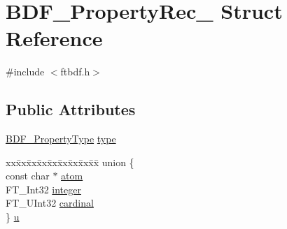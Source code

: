 \hypertarget{struct_b_d_f___property_rec__}{\section{B\-D\-F\-\_\-\-Property\-Rec\-\_\- Struct Reference}
\label{struct_b_d_f___property_rec__}
}


{\ttfamily \#include $<$ftbdf.\-h$>$}

\subsection*{Public Attributes}
\begin{DoxyCompactItemize}
\item 
\hyperlink{ftbdf_8h_a3e95a243aac87978075ca8b42635a0b2}{B\-D\-F\-\_\-\-Property\-Type} \hyperlink{struct_b_d_f___property_rec___a88c19ee6f16bd1b36127f5f7d44a4e39}{type}
\item 
\begin{tabbing}
xx\=xx\=xx\=xx\=xx\=xx\=xx\=xx\=xx\=\kill
union \{\\
\>const char $\ast$ \hyperlink{struct_b_d_f___property_rec___aa8d56dc848d8a2c8e2f7e40a63f5d032}{atom}\\
\>FT\_Int32 \hyperlink{struct_b_d_f___property_rec___a71243b414ad203fd7d6d2468c39bbd79}{integer}\\
\>FT\_UInt32 \hyperlink{struct_b_d_f___property_rec___adaba2e4ce8da90a5ea59080a0521d332}{cardinal}\\
\} \hyperlink{struct_b_d_f___property_rec___a7fdd16635fbcfd4f737e6beb2d014871}{u}\\

\end{tabbing}\end{DoxyCompactItemize}


